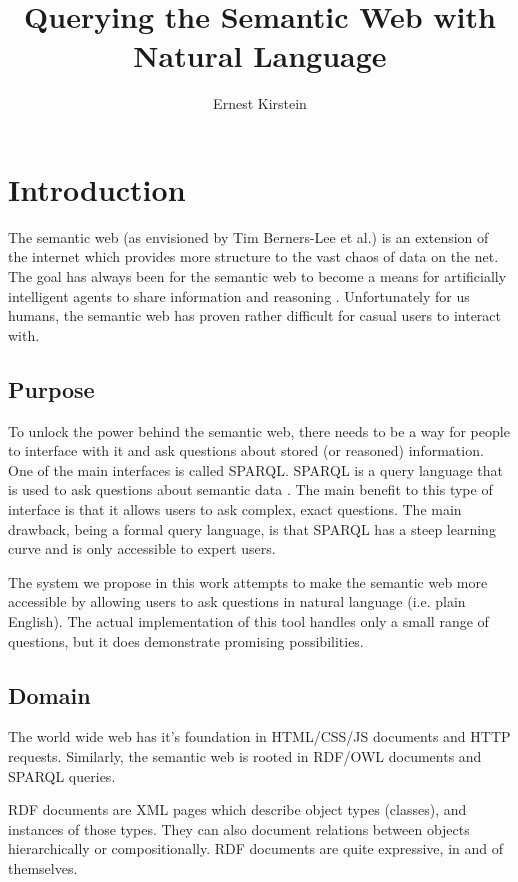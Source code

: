 \documentclass[11pt]{article}
\begin{document}
\title{Querying the Semantic Web with Natural Language}
\author{Ernest Kirstein}
\maketitle
\clearpage

\tableofcontents
\clearpage

\section{Introduction}
The semantic web (as envisioned by Tim Berners-Lee et al.) is an extension of
the internet which provides more structure to the vast chaos of data on the
net. The goal has always been for the semantic web to become
a means for artificially intelligent agents to share information and reasoning \cite{semantic}.
Unfortunately for us humans, the semantic web has proven rather difficult for
casual users to interact with.

\subsection{Purpose}

To unlock the power behind the semantic web, there needs to be a way for people
to interface with it and ask questions about stored (or reasoned) information. 
One of the main interfaces is called SPARQL. 
SPARQL is a query language that is used to ask questions about semantic
data \cite{sparql}. The main benefit to this type of interface is that it allows users to 
ask complex, exact questions. The main drawback, being a formal query language, is that
SPARQL has a steep learning curve and is only accessible to expert users.

The system we propose in this work attempts to make the semantic web more accessible
by allowing users to ask questions in natural language (i.e. plain English).
The actual implementation of this tool handles only a small range of questions,
but it does demonstrate promising possibilities.

\subsection{Domain}

The world wide web has it's foundation in HTML/CSS/JS documents and HTTP requests.
Similarly, the semantic web is rooted in RDF/OWL documents and SPARQL queries.

RDF documents are XML pages which
describe object types (classes), and instances of those types. 
They can also document relations between objects hierarchically or compositionally. 
RDF documents are quite expressive, in and of themselves. 
\end{document}
